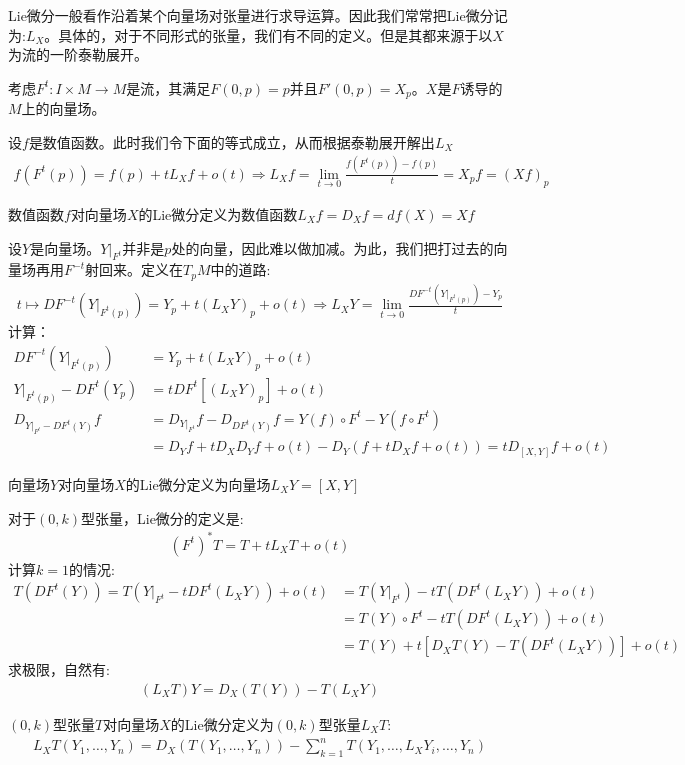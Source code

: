 Lie微分一般看作沿着某个向量场对张量进行求导运算。因此我们常常把Lie微分记为:$L_X$。具体的，对于不同形式的张量，我们有不同的定义。但是其都来源于以$X$为流的一阶泰勒展开。

考虑$F^t:I \times M \to M$是流，其满足$F(0,p)=p$并且$F'(0,p)=X_p$。$X$是$F$诱导的$M$上的向量场。

设$f$是数值函数。此时我们令下面的等式成立，从而根据泰勒展开解出$L_X$
\begin{align*}
    f(F^t(p))=f(p)+tL_X f+o(t) \Rightarrow L_X f=\lim_{t \to 0}\frac{f(F^t(p))-f(p)}{t}=X_p f=(Xf)_p
\end{align*}
\begin{definition}
    数值函数$f$对向量场$X$的Lie微分定义为数值函数$L_X f=D_X f=df(X)=Xf$
\end{definition}
设$Y$是向量场。$Y|_{F^t}$并非是$p$处的向量，因此难以做加减。为此，我们把打过去的向量场再用$F^{-t}$射回来。定义在$T_p M$中的道路:
\begin{align*}
    t \mapsto DF^{-t}(Y|_{F^t(p)})=Y_p+t(L_X Y)_p+o(t) \Rightarrow L_X Y=\lim_{t \to 0}\frac{DF^{-t}(Y|_{F^t(p)})-Y_p}{t}
\end{align*}
计算：
\begin{align*}
    DF^{-t}(Y|_{F^t(p)})&=Y_p+t(L_X Y)_p+o(t)\\
    Y|_{F^t(p)}-DF^t(Y_p)&=tDF^t[(L_X Y)_p]+o(t)\\
    D_{Y|_{F^t}-DF^t(Y)}f&=D_{Y|_{F^t}}f-D_{DF^t(Y)}f=Y(f) \circ F^t-Y(f \circ F^t)\\&=D_Yf+tD_X D_Y f+o(t)-D_Y(f+tD_X f+o(t))=tD_{[X,Y]}f+o(t)
\end{align*}
\begin{definition}
    向量场$Y$对向量场$X$的Lie微分定义为向量场$L_X Y=[X,Y]$
\end{definition}

对于$(0,k)$型张量，Lie微分的定义是:
\begin{align*}
    (F^t)^* T=T+t L_X T+o(t)
\end{align*}
计算$k=1$的情况:
\begin{align*}
    T(DF^t(Y))=T(Y|_{F^t}-tDF^t(L_X Y))+o(t)&=T(Y|_{F^t})-tT(DF^t(L_X Y))+o(t)\\&=T(Y) \circ F^t-tT(DF^t(L_X Y))+o(t)\\&=T(Y)+t[D_X T(Y)-T(DF^t(L_X Y))]+o(t)
\end{align*}
求极限，自然有:
\begin{align*}
    (L_X T)Y=D_X(T(Y))-T(L_X Y)
\end{align*}
\begin{definition}
    $(0,k)$型张量$T$对向量场$X$的Lie微分定义为$(0,k)$型张量$L_X T$:
    \begin{align*}
        L_X T(Y_1,\dots,Y_n)=D_X(T(Y_1,\dots,Y_n))-\sum_{k=1}^n T(Y_1,\dots,L_X Y_i,\dots,Y_n)
    \end{align*}
\end{definition}

